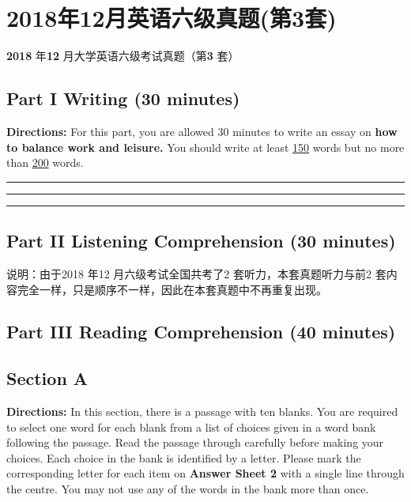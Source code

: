 \documentclass[UTF8,11pt]{ctexart}
\begin{document}
\section*{2018年12月英语六级真题(第3套)}
\textbf{2018} 年\textbf{12} 月大学英语六级考试真题（第\textbf{3} 套）


\subsection*{\textbf{Part I} \textbf{Writing} \textbf{(30 minutes)}}


\textbf{Directions:} For this part, you are allowed 30 minutes to write an essay on\textbf{ how to balance work and leisure.} You should write at least \uline{150} words but no more than \uline{200} words. \par\noindent\rule{.95\linewidth}{.4pt}\par  \par\noindent\rule{.95\linewidth}{.4pt}\par  \par\noindent\rule{.95\linewidth}{.4pt}\par


\subsection*{\textbf{Part II} \textbf{Listening Comprehension} \textbf{(30 minutes)}}


说明：由于2018 年12 月六级考试全国共考了2 套听力，本套真题听力与前2 套内容完全一样，只是顺序不一样，因此在本套真题中不再重复出现。


\subsection*{\textbf{Part III} \textbf{Reading Comprehension} \textbf{(40 minutes)}}


\subsection*{\textbf{Section A}}


\textbf{Directions:} In this section, there is a passage with ten blanks. You are required to select one word for each blank from a list of choices given in a word bank following the passage. Read the passage through carefully before making your choices. Each choice in the bank is identified by a letter. Please mark the corresponding letter for each item on\textbf{ Answer Sheet 2} with a single line through the centre. You may not use any of the words in the bank more than once.
\end{document}
